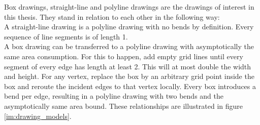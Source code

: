 Box drawings, straight-line and polyline drawings are the drawings of interest in this thesis. They stand in relation to each other in the following way:\\
A straight-line drawing is a polyline drawing with no bends by definition. Every sequence of line segments is of length 1.\\
A box drawing can be transferred to a polyline drawing with asymptotically the same area consumption. For this to happen, add empty grid lines until every segment of every edge has length at least 2. This will at most double the width and height. For any vertex, replace the box by an arbitrary grid point inside the box and reroute the incident edges to that vertex locally. Every box introduces a bend per edge, resulting in a polyline drawing with two bends and the asymptotically same area bound. These relationships are illustrated in figure \ref{im:drawing_models}.
\cite[P. 145]{Biedl_SP}

